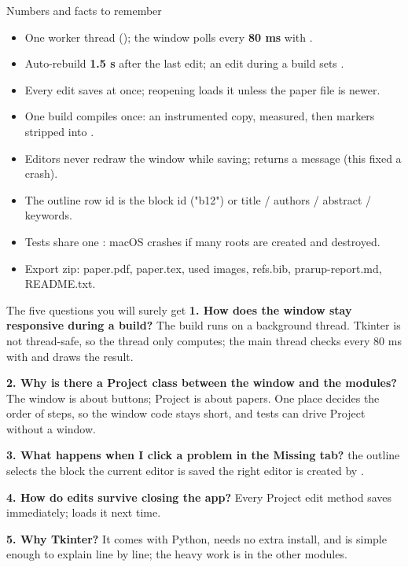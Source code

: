 \begin{cheat}{Numbers and facts to remember}
\begin{itemize}
\item One worker thread (); the window polls every \textbf{80 ms} with .
\item Auto-rebuild \textbf{1.5 s} after the last edit; an edit during a build sets .
\item Every edit saves  at once; reopening loads it unless the paper file is newer.
\item One build compiles once: an instrumented copy, measured, then markers stripped into .
\item Editors never redraw the window while saving;  returns a message (this fixed a crash).
\item The outline row id is the block id ("b12") or title / authors / abstract / keywords.
\item Tests share one : macOS crashes if many roots are created and destroyed.
\item Export zip: paper.pdf, paper.tex, used images, refs.bib, prarup-report.md, README.txt.
\end{itemize}
\end{cheat}

\begin{cheat}{The five questions you will surely get}
\textbf{1. How does the window stay responsive during a build?} The build runs on a background thread. Tkinter is not thread-safe, so the thread only computes; the main thread checks every 80 ms with  and draws the result.\par
\textbf{2. Why is there a Project class between the window and the modules?} The window is about buttons; Project is about papers. One place decides the order of steps, so the window code stays short, and tests can drive Project without a window.\par
\textbf{3. What happens when I click a problem in the Missing tab?}  \textrightarrow{}  \textrightarrow{} the outline selects the block \textrightarrow{} the current editor is saved \textrightarrow{} the right editor is created by .\par
\textbf{4. How do edits survive closing the app?} Every Project edit method saves  immediately;  loads it next time.\par
\textbf{5. Why Tkinter?} It comes with Python, needs no extra install, and is simple enough to explain line by line; the heavy work is in the other modules.
\end{cheat}
